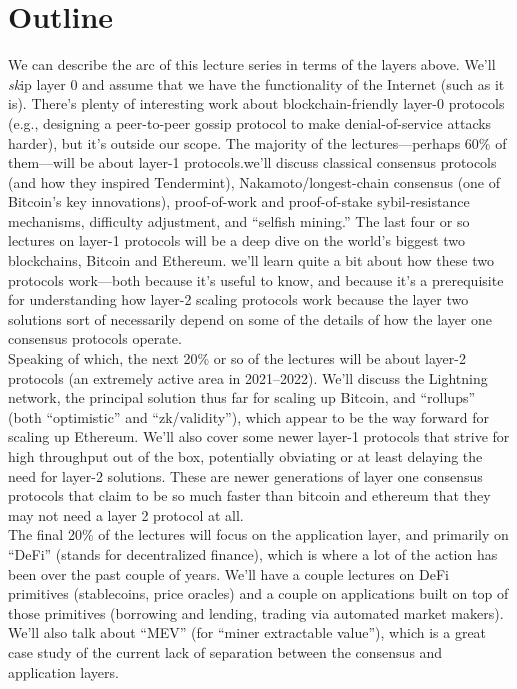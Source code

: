 \section{Outline}
 We can describe the arc of this lecture series in terms of the layers above. We’ll \textit{sk}ip layer 0
and assume that we have the functionality of the Internet (such as it is). There’s plenty of
interesting work about blockchain-friendly layer-0 protocols (e.g., designing a peer-to-peer
gossip protocol to make denial-of-service attacks harder), but it’s outside our scope.
The majority of the lectures—perhaps 60\% of them—will be about layer-1 protocols.we’ll discuss classical
consensus protocols (and how they inspired Tendermint), Nakamoto/longest-chain consensus
(one of Bitcoin’s key innovations), proof-of-work and proof-of-stake sybil-resistance mechanisms, difficulty adjustment, and “selfish mining.” The last four or so lectures on layer-1
protocols will be a deep dive on the world’s biggest two blockchains, Bitcoin and Ethereum. 
we’ll learn quite a
bit about how these two protocols work—both because it’s useful to know, and because it’s
a prerequisite for understanding how layer-2 scaling protocols work because the layer two
solutions sort of necessarily depend on
some of the details of how the layer one
consensus protocols operate.\\
Speaking of which, the next 20\% or so of the lectures will be about layer-2 protocols
(an extremely active area in 2021–2022). We’ll discuss the Lightning network, the principal
solution thus far for scaling up Bitcoin, and “rollups” (both “optimistic” and “zk/validity”),
    which appear to be the way forward for scaling up Ethereum. We’ll also
cover some newer layer-1 protocols that strive for high throughput out of the box, potentially
obviating or at least delaying the need for layer-2 solutions. These are newer
generations of layer one consensus
protocols that claim to be so much
faster than bitcoin and ethereum that
they may not need a layer 2
protocol at all.\\
The final 20\% of the lectures will focus on the application layer, and primarily on “DeFi”
(stands for decentralized finance), which is where a lot of the action has been over the past couple
of years. We’ll have a couple lectures on DeFi primitives (stablecoins, price oracles) and a
couple on applications built on top of those primitives (borrowing and lending, trading via
automated market makers). We’ll also talk about “MEV” (for “miner extractable value”),
which is a great case study of the current lack of separation between the consensus and
application layers.\\


